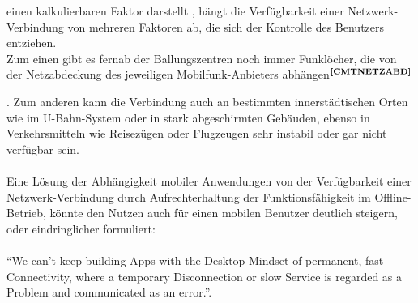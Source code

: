 einen kalkulierbaren Faktor darstellt%
, hängt die Verfügbarkeit einer Netzwerk-Verbindung von mehreren Faktoren ab, die sich der Kontrolle des Benutzers entziehen.\\
Zum einen gibt es fernab der Ballungszentren noch immer Funklöcher, die von der Netzabdeckung des jeweiligen Mobilfunk-Anbieters abhängen$^{\textbf{\ref{CMTNETZABD}}}$%
\addtocounter{footnote}{1}%
.
Zum anderen kann die Verbindung auch an bestimmten innerstädtischen Orten wie im U-Bahn-System oder in stark abgeschirmten Gebäuden, ebenso in Verkehrsmitteln wie Reisezügen oder Flugzeugen sehr instabil oder gar nicht verfügbar sein.\\ \\
\noindent
Eine Lösung der Abhängigkeit mobiler Anwendungen von der Verfügbarkeit einer Netzwerk-Verbindung durch Aufrechterhaltung der Funktionsfähigkeit im Offline-Betrieb, könnte den Nutzen auch für einen mobilen Benutzer deutlich steigern, oder eindringlicher formuliert:\\ \\
"`We can’t keep building Apps with the Desktop Mindset of permanent, fast Connectivity, where a temporary Disconnection or slow Service is regarded as a Problem and communicated as an error."'\cite{OFFLFIRST:WWW}.
	 
